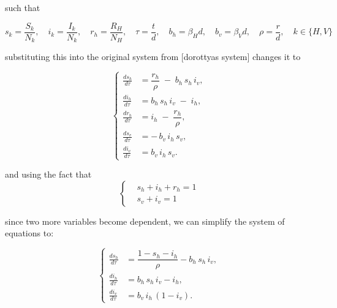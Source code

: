 such that 

\begin{equation}
s_k = \frac{S_k}{N_k}, \quad i_k = \frac{I_k}{N_k}, \quad r_h = \frac{R_H}{N_H}, \quad \tau = \frac{t}{d}, \quad b_h = \beta_H d, \quad b_v = \beta_Vd, \quad \rho = \frac{r}{d}, \quad k \in \{H,V\}    
\end{equation}


substituting this into the original system from [dorottyas system] changes it to 

\begin{equation}
\left\{
\begin{aligned}
\displaystyle
\frac{ds_h}{d\tau} &= \dfrac{r_h}{\rho} \;-\; b_h\,s_h\,i_v,\\[1ex]
\frac{di_h}{d\tau} &= b_h\,s_h\,i_v \;-\; i_h,\\[1ex]
\frac{dr_h}{d\tau} &= i_h \;-\; \dfrac{r_h}{\rho},\\[1ex]
\frac{ds_v}{d\tau} &= -\,b_v\,i_h\,s_v,\\[1ex]
\frac{di_v}{d\tau} &= b_v\,i_h\,s_v.
\end{aligned}
\right.
\end{equation}

and using the fact that
\begin{equation}
\left\{
\begin{aligned}
        &s_h + i_h +r_h = 1 \\
        &s_v + i_v = 1
\end{aligned}
\right.
\end{equation}

since two more variables become dependent, we can simplify the system of equations to: 

\begin{equation} \label{model}
\left\{
\begin{aligned}
\frac{ds_h}{d\tau}
  &= \dfrac{1 - s_h - i_h}{\rho}
   - b_h\,s_h\,i_v,\\[0.5ex]
\frac{di_h}{d\tau}
  &= b_h\,s_h\,i_v
   - i_h,\\[0.5ex]
\frac{di_v}{d\tau}
  &= b_v\,i_h\,(1 - i_v).
\end{aligned}
\right.
\end{equation}


